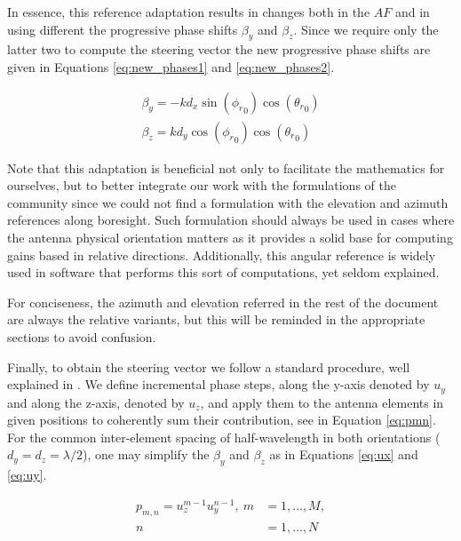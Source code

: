 In essence, this reference adaptation results in changes both in the $AF$ and in using different the progressive phase shifts $\beta_y$ and $\beta_z$. Since we require only the latter two to compute the steering vector the new progressive phase shifts are given in Equations \eqref{eq:new_phases1} and \eqref{eq:new_phases2}. 

\begin{subequations}
    \begin{align}
        \beta_y = -k d_x \sin({\phi_r}_0) \cos({\theta_r}_0) \label{eq:new_phases1} \\
        \beta_z = k d_y\cos({\phi_r}_0) \cos({\theta_r}_0)\label{eq:new_phases2}
    \end{align}
\end{subequations}

Note that this adaptation is beneficial not only to facilitate the mathematics for ourselves, but to better integrate our work with the formulations of the community since we could not find a formulation with the elevation and azimuth references along boresight. Such formulation should always be used in cases where the antenna physical orientation matters as it provides a solid base for computing gains based in relative directions. Additionally, this angular reference is widely used in software that performs this sort of computations, yet seldom explained.

For conciseness, the azimuth and elevation referred in the rest of the document are always the relative variants, but this will be reminded in the appropriate sections to avoid confusion.

Finally, to obtain the steering vector we follow a standard procedure, well explained in \cite{7925023}. We define incremental phase steps, along the y-axis denoted by $u_y$ and along the z-axis, denoted by $u_z$, and apply them to the antenna elements in given positions to coherently sum their contribution, see in Equation \eqref{eq:pmn}.
For the common inter-element spacing of half-wavelength in both orientations ($d_y = d_z = \lambda/2$), one may simplify the $\beta_y$ and $\beta_z$ as in Equations \eqref{eq:ux} and \eqref{eq:uy}.

\begin{align}
    p_{m,n} = u_z^{m-1} u_y^{n-1}, \ m &= 1, \dots, M, \label{eq:pmn} \\
    n &= 1, \dots, N \nonumber
\end{align}
\vspace{-1cm}


